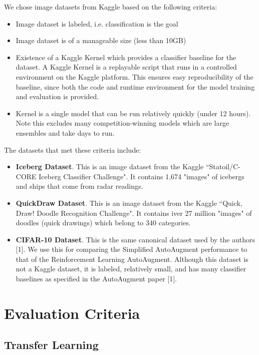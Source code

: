 \documentclass[10pt,twocolumn,letterpaper]{article}
\begin{document}
We chose image datasets from Kaggle based on the following criteria:

\begin{itemize}
  \item Image dataset is labeled, i.e. classification is the goal
  \item Image dataset is of a manageable size (less than 10GB)
  \item Existence of a Kaggle Kernel which provides a classifier baseline for the dataset.  A Kaggle Kernel is a replayable script that runs in a controlled environment on the Kaggle platform.  This ensures easy reproducibility of the baseline, since both the code and runtime environment for the model training and evaluation is provided.
  \item Kernel is a single model that can be run relatively quickly (under 12 hours).  Note this excludes many competition-winning models which are large ensembles and take days to run.
\end{itemize}

The datasets that met these criteria include:

\begin{itemize}
  \item \textbf{Iceberg Dataset}.  This is an image dataset from the Kaggle “Statoil/C-CORE Iceberg Classifier Challenge".  It contains 1,674 "images" of icebergs and ships that come from radar readings.  
  \item \textbf{QuickDraw Dataset}.  This is an image dataset from the Kaggle “Quick, Draw! Doodle Recognition Challenge".  It contains iver 27 million "images" of doodles (quick drawings) which belong to 340 categories.  
  \item \textbf{CIFAR-10 Dataset}.  This is the same canonical dataset used by the authors [1].  We use this for comparing the Simplified AutoAugment performance to that of the Reinforcement Learning AutoAugment.  Although this dataset is not a Kaggle dataset, it is labeled, relatively small, and has many classifier baselines as specified in the AutoAugment paper [1].        
\end{itemize}


\section{Evaluation Criteria}

\subsection{Transfer Learning}
\end{document}
